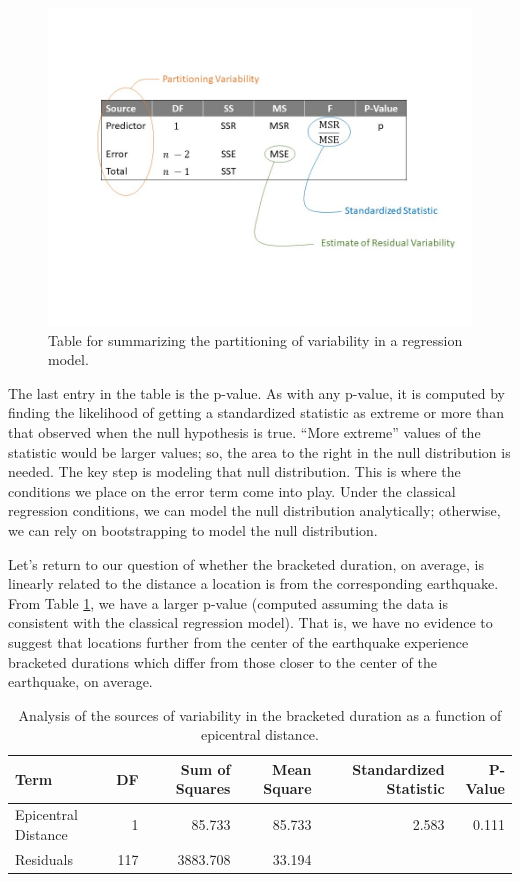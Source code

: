 \documentclass[
]{book}
\theoremstyle{plain}
\theoremstyle{mydefn}
\theoremstyle{myexmpl}
\theoremstyle{remark}
\begin{document}
\begin{figure}

{\centering \includegraphics[width=0.8\linewidth]{./images/RegQuality-ANOVA-Table} 

}

\caption{Table for summarizing the partitioning of variability in a regression model.}\label{fig:regquality-ANOVA-Table}
\end{figure}

The last entry in the table is the p-value. As with any p-value, it is computed by finding the likelihood of getting a standardized statistic as extreme or more than that observed when the null hypothesis is true. ``More extreme'' values of the statistic would be larger values; so, the area to the right in the null distribution is needed. The key step is modeling that null distribution. This is where the conditions we place on the error term come into play. Under the classical regression conditions, we can model the null distribution analytically; otherwise, we can rely on bootstrapping to model the null distribution.

Let's return to our question of whether the bracketed duration, on average, is linearly related to the distance a location is from the corresponding earthquake. From Table \ref{tab:regquality-anova}, we have a larger p-value (computed assuming the data is consistent with the classical regression model). That is, we have no evidence to suggest that locations further from the center of the earthquake experience bracketed durations which differ from those closer to the center of the earthquake, on average.

\begin{table}

\caption{\label{tab:regquality-anova}Analysis of the sources of variability in the bracketed duration as a function of epicentral distance.}
\centering
\begin{tabular}[t]{l|r|r|r|r|r}
\hline
Term & DF & Sum of Squares & Mean Square & Standardized Statistic & P-Value\\
\hline
Epicentral Distance & 1 & 85.733 & 85.733 & 2.583 & 0.111\\
\hline
Residuals & 117 & 3883.708 & 33.194 &  & \\
\hline
\end{tabular}
\end{table}
\end{document}

